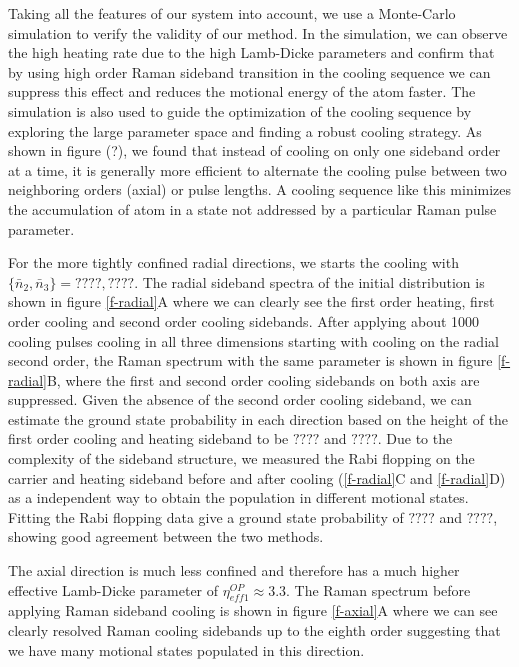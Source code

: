 \documentclass[aps,prl,twocolumn,groupedaddress]{revtex4-1}
\begin{document}
Taking all the features of our system into account, we use a Monte-Carlo simulation to verify
the validity of our method.
In the simulation, we can observe the high heating rate due to the high Lamb-Dicke parameters
and confirm that by using high order Raman sideband transition in the cooling sequence we can
suppress this effect and reduces the motional energy of the atom faster.
The simulation is also used to guide the optimization of the cooling sequence by exploring the
large parameter space and finding a robust cooling strategy. As shown in figure (?),
we found that instead of cooling on only one sideband order at a time, it is generally more
efficient to alternate the cooling pulse between two neighboring orders (axial) or pulse lengths.
A cooling sequence like this minimizes the accumulation of atom in a state not addressed by a
particular Raman pulse parameter.

For the more tightly confined radial directions,
we starts the cooling with $\{\bar n_2, \bar n_3\}=????, ????$.
The radial sideband spectra of the initial distribution is shown in figure \ref{f-radial}A
where we can clearly see the first order heating, first order cooling and
second order cooling sidebands.
After applying about 1000 cooling pulses cooling in all three dimensions
starting with cooling on the radial second order,
the Raman spectrum with the same parameter is shown in figure \ref{f-radial}B,
where the first and second order cooling sidebands on both axis are suppressed.
Given the absence of the second order cooling sideband,
we can estimate the ground state probability in each direction based on the height of
the first order cooling and heating sideband to be $????$ and $????$.
Due to the complexity of the sideband structure,
we measured the Rabi flopping on the carrier and heating sideband before and after cooling
(\ref{f-radial}C and \ref{f-radial}D)
as a independent way to obtain the population in different motional states.
Fitting the Rabi flopping data give a ground state probability of $????$ and $????$,
showing good agreement between the two methods.

The axial direction is much less confined and therefore has a much higher
effective Lamb-Dicke parameter of $\eta^{OP}_{eff1}\approx3.3$. The Raman spectrum before applying Raman sideband cooling is shown in figure \ref{f-axial}A where we can see clearly resolved Raman cooling sidebands up to the eighth order suggesting that we have many motional states populated in this direction.



\end{document}
